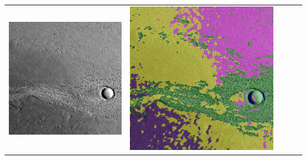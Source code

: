 \begin{table}[h!]
\begin{tabularx}{\textwidth}{>{\centering}m{}
			>{\centering}m{}
			>{\centering}m{}
			>{\centering}m{}
			>{\centering\arraybackslash}m{}}
		\includegraphics[width=0.9\linewidth]{images/p03/p03_02.png} &
		\includegraphics[width=0.9\linewidth]{images/gen/pooling_layers/p03_02.png_1.png} &

\end{tabularx}
\end{table}

